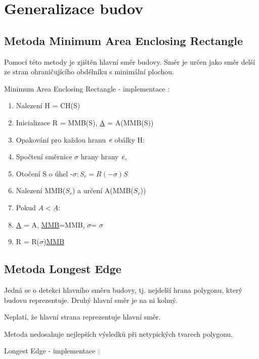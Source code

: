\documentclass[oneside,12pt,a4paper]{book}
\begin{document}
\section{Generalizace budov}
\subsection{Metoda Minimum Area Enclosing Rectangle}
Pomocí této metody je zjištěn hlavní směr budovy. Směr je určen jako směr delší ze stran ohraničujícího obdélníku s minimální plochou. \par

\bigskip

Minimum Area Enclosing Rectangle - implementace $:$

\begin{enumerate}
\item Nalezení H = CH(S)
\item Inicializace R = MMB(S), \underline{A} = A(MMB(S))
\item Opakování pro každou hranu $\emph{e}$ obálky H:
\item \quad Spočtení směrnice $\sigma$ hrany hrany $\emph{e}$,
\item \quad Otočení S o úhel -$\sigma: S_r =R(-\sigma)S$
\item \quad Nalezení MMB($S_r$) a určení A(MMB($S_r$))
\item \quad Pokud $A < \underline{A}$:
\item \quad \quad \quad \underline{A} = A, \underline{MMB}=MMB, \underline{$\sigma$}= $\sigma$
\item R = R(\underline{$\sigma$})\underline{MMB}

\end{enumerate}

\bigskip

\subsection{Metoda Longest Edge}
Jedná se o detekci hlavního směru budovy, tj. nejdelší hrana polygonu, který budovu reprezentuje. Druhý hlavní směr je na ni kolmý.\par
Neplatí, že hlavní strana reprezentuje hlavní směr.\par
Metoda nedosahuje nejlepších výsledků při netypických tvarech polygonu.\par

\bigskip

Longest Edge - implementace $:$
\end{document}
